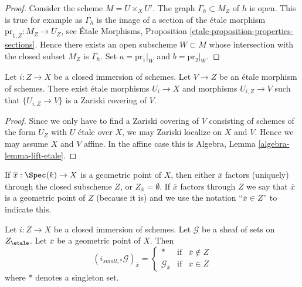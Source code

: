 \begin{proof}
Consider the scheme $M = U \times_X U'$. The graph $\Gamma_h \subset M_Z$
of $h$ is open. This is true for example as $\Gamma_h$ is the image of a
section of the \'etale morphism $\text{pr}_{1, Z} : M_Z \to U_Z$, see
\'Etale Morphisms, Proposition \ref{etale-proposition-properties-sections}.
Hence there exists an open subscheme $W \subset M$ whose intersection with
the closed subset $M_Z$ is $\Gamma_h$. Set $a = \text{pr}_1|_W$
and $b = \text{pr}_2|_W$.
\end{proof}

\begin{lemma}
\label{lemma-closed-immersion-almost-essentially-surjective}
Let $i : Z \to X$ be a closed immersion of schemes.
Let $V \to Z$ be an \'etale morphism of schemes.
There exist \'etale morphisms $U_i \to X$ and morphisms
$U_{i, Z} \to V$ such that $\{U_{i, Z} \to V\}$
is a Zariski covering of $V$.
\end{lemma}

\begin{proof}
Since we only have to find a Zariski covering of $V$ consisting of schemes
of the form $U_Z$ with $U$ \'etale over $X$, we may Zariski localize on $X$
and $V$. Hence we may assume $X$ and $V$ affine. In the affine case this is
Algebra, Lemma \ref{algebra-lemma-lift-etale}.
\end{proof}

\noindent
If $\overline{x} : \Spec(k) \to X$ is a geometric point of $X$, then
either $\overline{x}$ factors (uniquely) through the closed subscheme $Z$, or
$Z_{\overline{x}} = \emptyset$. If $\overline{x}$ factors through $Z$
we say that $\overline{x}$ is a geometric point of $Z$ (because it is) and
we use the notation ``$\overline{x} \in Z$'' to indicate this.

\begin{lemma}
\label{lemma-stalk-pushforward-closed-immersion}
Let $i : Z \to X$ be a closed immersion of schemes.
Let $\mathcal{G}$ be a sheaf of sets on $Z_\etale$.
Let $\overline{x}$ be a geometric point of $X$.
Then
$$
(i_{small, *}\mathcal{G})_{\overline{x}} =
\left\{
\begin{matrix}
* & \text{if} & \overline{x} \not \in Z \\
\mathcal{G}_{\overline{x}} & \text{if} & \overline{x} \in Z
\end{matrix}
\right.
$$
where $*$ denotes a singleton set.
\end{lemma}

